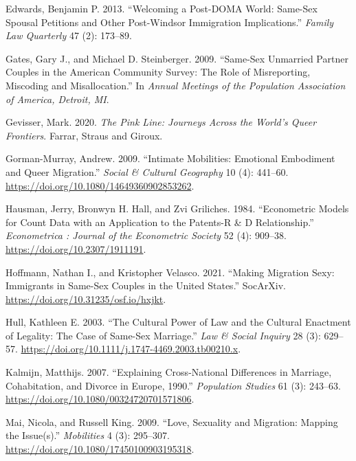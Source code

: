 \documentclass[
  12pt,
]{article}
\newlength{\cslhangindent}
\newlength{\cslentryspacingunit} %
\newenvironment{CSLReferences}[2] %
 {%
  \setlength{\parindent}{0pt}
  \ifodd #1
  \let\oldpar\par
  \def\par{\hangindent=\cslhangindent\oldpar}
  \fi
  \setlength{\parskip}{#2\cslentryspacingunit}
 }%
 {}
\begin{document}
\begin{CSLReferences}{1}{0}
\leavevmode{}%
Edwards, Benjamin P. 2013. {``Welcoming a {Post-DOMA World}: {Same-Sex Spousal Petitions} and {Other Post-Windsor Immigration Implications}.''} \emph{Family Law Quarterly} 47 (2): 173--89.

\leavevmode{}%
Gates, Gary J., and Michael D. Steinberger. 2009. {``Same-Sex Unmarried Partner Couples in the {American Community Survey}: {The} Role of Misreporting, Miscoding and Misallocation.''} In \emph{Annual Meetings of the Population Association of America, Detroit, {MI}}.

\leavevmode{}%
Gevisser, Mark. 2020. \emph{The {Pink Line}: {Journeys Across} the {World}'s {Queer Frontiers}}. {Farrar, Straus and Giroux}.

\leavevmode{}%
Gorman-Murray, Andrew. 2009. {``Intimate Mobilities: {Emotional} Embodiment and Queer Migration.''} \emph{Social \& Cultural Geography} 10 (4): 441--60. \url{https://doi.org/10.1080/14649360902853262}.

\leavevmode{}%
Hausman, Jerry, Bronwyn H. Hall, and Zvi Griliches. 1984. {``Econometric {Models} for {Count Data} with an {Application} to the {Patents-R} \& {D Relationship}.''} \emph{Econometrica : Journal of the Econometric Society} 52 (4): 909--38. \url{https://doi.org/10.2307/1911191}.

\leavevmode{}%
Hoffmann, Nathan I., and Kristopher Velasco. 2021. {``Making {Migration Sexy}: {Immigrants} in {Same-Sex Couples} in the {United States}.''} {SocArXiv}. \url{https://doi.org/10.31235/osf.io/hxjkt}.

\leavevmode{}%
Hull, Kathleen E. 2003. {``The {Cultural Power} of {Law} and the {Cultural Enactment} of {Legality}: {The Case} of {Same-Sex Marriage}.''} \emph{Law \& Social Inquiry} 28 (3): 629--57. \url{https://doi.org/10.1111/j.1747-4469.2003.tb00210.x}.

\leavevmode{}%
Kalmijn, Matthijs. 2007. {``Explaining Cross-National Differences in Marriage, Cohabitation, and Divorce in {Europe}, 1990.''} \emph{Population Studies} 61 (3): 243--63. \url{https://doi.org/10.1080/00324720701571806}.

\leavevmode{}%
Mai, Nicola, and Russell King. 2009. {``Love, {Sexuality} and {Migration}: {Mapping} the {Issue}(s).''} \emph{Mobilities} 4 (3): 295--307. \url{https://doi.org/10.1080/17450100903195318}.


\end{CSLReferences}
\end{document}
